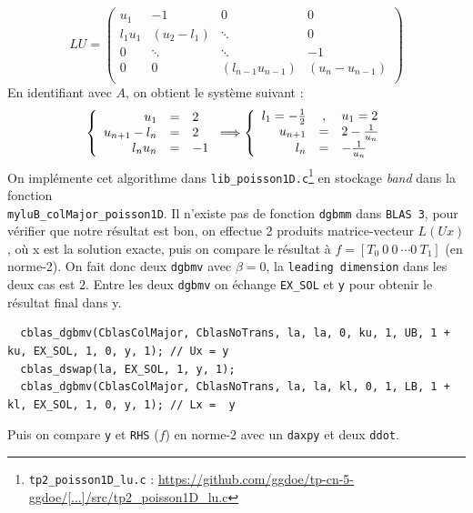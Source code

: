 \documentclass{article}
\begin{document}
\[
	LU = 
	\begin{pmatrix}
			u_1		& 	-1		&	0				& 0		\\
			l_1 u_1	&	(u_2-l_1)	&\ddots				& 0		\\
			0		& 	\ddots	&\ddots				& -1	\\
			0		& 	0		& (l_{n-1} u_{n-1}) 	& (u_n-u_{n-1})	\\
	\end{pmatrix}
\]
En identifiant avec $A$, on obtient le système suivant :
\[
	\left \{
	\begin{array}{r c l}
		u_1 & = & 2 \\
		u_{n+1} - l_n & = & 2 \\
		l_n u_n & = & -1
	\end{array}
	\right .
	\Longrightarrow
	\left \{
	\begin{array}{r c l}
		l_1 = -\frac{1}{2} & , & u_1 = 2 \\
		u_{n+1} & = & 2 - \frac{1}{u_n} \\
		l_n & = & -\frac{1}{u_n}
	\end{array}
	\right .
\]
On implémente cet algorithme dans \texttt{lib\_poisson1D.c}\footnote{\texttt{tp2\_poisson1D\_lu.c} : \href{https://github.com/ggdoe/tp-cn-5-ggdoe/blob/master/TP_Poisson_C_for_students/src/tp2_poisson1D_lu.c}{https://github.com/ggdoe/tp-cn-5-ggdoe/[...]/src/tp2\_poisson1D\_lu.c}} en stockage \textit{band} dans la fonction \\\texttt{myluB\_colMajor\_poisson1D}. Il n'existe pas de fonction \texttt{dgbmm} dans \texttt{BLAS 3}, pour vérifier que notre résultat est bon, on effectue 2 produits matrice-vecteur \(L(Ux)\), où x est la solution exacte, puis on compare le résultat à \(f = \left[T_0\ 0\ 0\ \cdots 0\ T_1\right]\) (en norme-2).
On fait donc deux \texttt{dgbmv} avec $\beta = 0$, la \texttt{leading dimension} dans les deux cas est $2$. Entre les deux \texttt{dgbmv} on échange \texttt{EX\_SOL} et \texttt{y} pour obtenir le résultat final dans y.
\begin{scriptsize}
\begin{verbatim}
  cblas_dgbmv(CblasColMajor, CblasNoTrans, la, la, 0, ku, 1, UB, 1 + ku, EX_SOL, 1, 0, y, 1); // Ux = y
  cblas_dswap(la, EX_SOL, 1, y, 1);
  cblas_dgbmv(CblasColMajor, CblasNoTrans, la, la, kl, 0, 1, LB, 1 + kl, EX_SOL, 1, 0, y, 1); // Lx =  y
\end{verbatim}
\end{scriptsize}
Puis on compare \texttt{y} et \texttt{RHS} ($f$) en norme-2 avec un \texttt{daxpy} et deux \texttt{ddot}.
\end{document}
